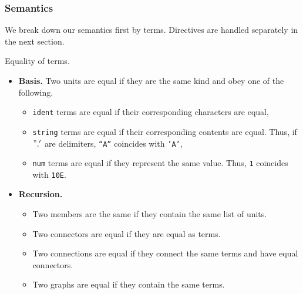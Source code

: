 

\subsubsection*{Semantics}
We break down our semantics first by terms. Directives are handled separately in the next section.
\begin{definition}
Equality of terms.
\begin{itemize}
  \item \textbf{Basis.} Two units are equal if they are the same kind and obey one of the following.
	\begin{itemize}
	  \item \texttt{ident} terms are equal if their corresponding characters are equal,
      \item \texttt{string} terms are equal if their corresponding contents are equal. Thus, if $", '$ are delimiters, \texttt{``A''} coincides with \texttt{'A'},
	  \item \texttt{num} terms are equal if they represent the same value. Thus, \texttt{1} coincides with \texttt{10E}.
	\end{itemize}
  \item \textbf{Recursion.}
        \begin{itemize}
        \item Two members are the same if they contain the same list of units. %
        \item Two connectors are equal if they are equal as terms. %
 		  \item Two connections are equal if they connect the same terms and have equal connectors.
		  \item Two graphs are equal if they contain the same terms.
	\end{itemize}
\end{itemize}
\end{definition}
